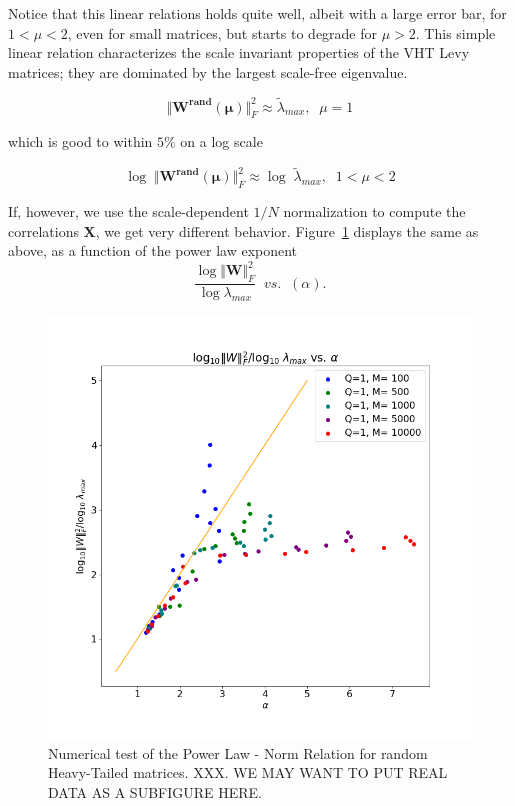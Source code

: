 
Notice that this linear relations holds quite well, albeit with a large error bar, for $1<\mu<2$, even for small matrices, but starts to degrade for $\mu>2$.
This simple linear relation characterizes the scale invariant properties of the VHT Levy matrices; they are dominated by the largest scale-free eigenvalue.

$$\Vert\mathbf{W^{rand}(\mu)}\Vert^{2}_{F}\approx\tilde{\lambda}_{max},\;\;\mu=1$$


which is good to within $5\%$ on a log scale

$$\log\;\Vert\mathbf{W^{rand}(\mu)}\Vert^{2}_{F}\approx\log\;\tilde{\lambda}_{max},\;\;1<\mu<2$$


If, however, we use the scale-dependent $1/N$ normalization to compute the correlations $\mathbf{X}$, we get very different behavior.
Figure~\ref{fig:randW} displays the same as above, as a function of the power law exponent 
$$
\dfrac{\log\Vert\mathbf{W}\Vert^{2}_{F}}{\log\lambda_{max}}\;\;vs.\;\;(\alpha)  .
$$

\begin{figure}[!htb]
 \centering
   \includegraphics[scale=0.40]{img/Alpha-LogNorm-Relations.png}
   \caption{
Numerical test of the  Power Law - Norm Relation for random Heavy-Tailed matrices.
XXX.  WE MAY WANT TO PUT REAL DATA AS A SUBFIGURE HERE.
}
  \label{fig:randW}
\end{figure}

